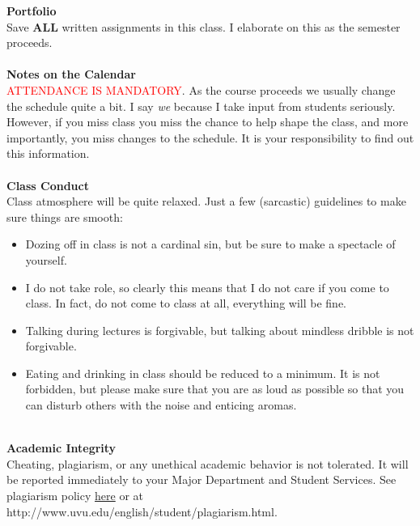 \documentclass [11pt]{article}
\begin{document}
 {\bf Portfolio}\\
   Save {\bf ALL} written assignments in this class. I elaborate on this as the semester proceeds. \\
   \ \\ 

   {\bf Notes on the Calendar}\\
  \textcolor{red}{ATTENDANCE IS MANDATORY}. As the course proceeds we usually change the schedule quite a bit. I say {\it we} because I take input from students seriously. However, if you miss class you miss the chance to help shape the class, and more importantly, you miss changes to the schedule. It is your responsibility to find out this information. \\
   \ \\  

   {\bf Class Conduct}\\
   Class atmosphere will be quite relaxed. Just a few (sarcastic) guidelines to make sure things are smooth:
   \begin{itemize}
   \item  Dozing off in class is not a cardinal sin, but be sure to make a spectacle of yourself.
   \item I do not take role, so clearly this means that I do not care if you come to class. In fact, do not come to class at all, everything will be fine.
    \item Talking during lectures is forgivable, but talking about mindless dribble is not forgivable.
     \item  Eating and drinking in class should be reduced to a minimum. It is not forbidden, but please make sure that you are as loud as possible so that you can disturb others with the noise and enticing aromas.
        
    \end{itemize}
   \ \\
       

   {\bf Academic Integrity}\\
 Cheating, plagiarism, or any unethical academic behavior is not tolerated. It will be reported immediately to your Major Department and Student Services. See plagiarism policy \href{http://www.uvu.edu/english/student/plagiarism.html}{here} or at http://www.uvu.edu/english/student/plagiarism.html.\\
   \ \\
  
\end{document}
